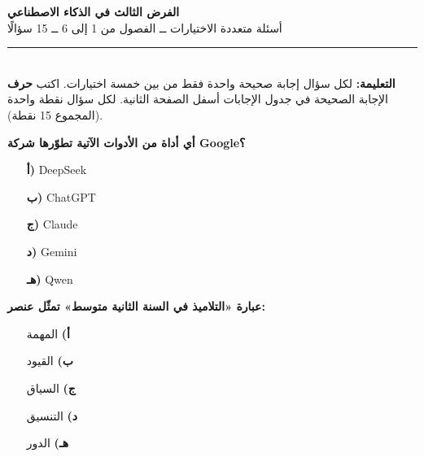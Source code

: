 \documentclass[11pt,a4paper]{article}
\begin{document}
\begin{center}
{\Large\khatt\textbf{الفرض الثالث في الذكاء الاصطناعي}}\\[2pt]
{\normalsize أسئلة متعددة الاختيارات ــ الفصول من 1 إلى 6 ــ 15 سؤالًا}
\end{center}
\vspace{-4pt}\rule{\textwidth}{0.6pt}\\
{\small\textbf{التعليمة:} لكل سؤال إجابة صحيحة واحدة فقط من بين خمسة اختيارات.
اكتب \textbf{حرف} الإجابة الصحيحة في جدول الإجابات أسفل الصفحة الثانية.
لكل سؤال نقطة واحدة (المجموع 15 نقطة).}
\vspace{-2pt}
\begin{multicols}{2}

\noindent\begin{minipage}{\linewidth}
\hangindent=0.7cm\textbf{أي أداة من الأدوات الآتية تطوّرها شركة \textenglish{Google}؟}
\begin{itemize}[leftmargin=0.95cm, labelsep=4pt, itemsep=0pt, topsep=2pt, parsep=0pt]
  \item[\textbf{أ)}] \textenglish{DeepSeek}
  \item[\textbf{ب)}] \textenglish{ChatGPT}
  \item[\textbf{ج)}] \textenglish{Claude}
  \item[\textbf{د)}] \textenglish{Gemini}
  \item[\textbf{هـ)}] \textenglish{Qwen}
\end{itemize}
\end{minipage}\par\vspace{7pt plus 4pt}
\noindent\begin{minipage}{\linewidth}
\hangindent=0.7cm\textbf{عبارة «التلاميذ في السنة الثانية متوسط» تمثّل عنصر:}
\begin{itemize}[leftmargin=0.95cm, labelsep=4pt, itemsep=0pt, topsep=2pt, parsep=0pt]
  \item[\textbf{أ)}] المهمة
  \item[\textbf{ب)}] القيود
  \item[\textbf{ج)}] السياق
  \item[\textbf{د)}] التنسيق
  \item[\textbf{هـ)}] الدور
\end{itemize}
\end{minipage}\par\vspace{7pt plus 4pt}
\noindent\begin{minipage}{\linewidth}

\end{minipage}
\end{multicols}
\end{document}
